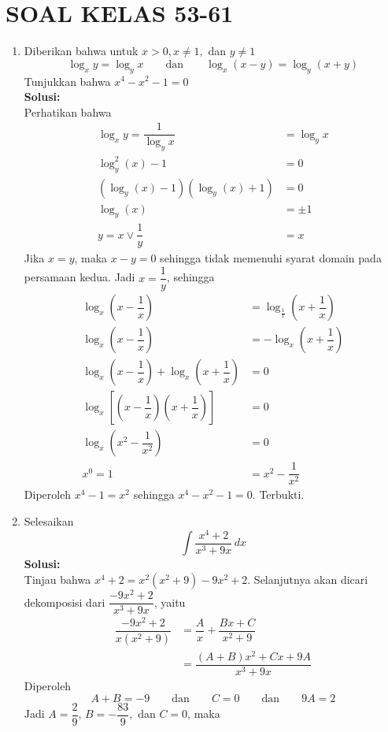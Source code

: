 \documentclass{article}
\begin{document}
\section*{SOAL KELAS 53-61}
\begin{enumerate}
	\item Diberikan bahwa untuk $x>0,x\neq 1,$ dan $y\neq 1$
	$$ \log_x y = \log_y x \qquad \text{dan}\qquad \log_x(x-y) = \log_y(x+y)$$
	Tunjukkan bahwa $x^4-x^2-1=0$\\
	\textbf{Solusi:}\\
	Perhatikan bahwa
	\begin{align*}
	\log_x y = \dfrac{1}{\log_y x} &= \log_y x\\
	\log_y^2 (x)-1 &= 0\\
	(\log_y (x)-1)(\log_y (x)+1) &= 0\\
	\log_y (x) &= \pm 1\\
	y = x \vee \dfrac{1}{y} &= x
	\end{align*}
	Jika $x=y$, maka $x-y=0$ sehingga tidak memenuhi syarat domain pada persamaan kedua. Jadi $x=\dfrac{1}{y}$, sehingga
	\begin{align*}
	\log_x \left(x-\dfrac{1}{x}\right) &= \log_{\frac{1}{x}} \left(x+\dfrac{1}{x}\right)\\
	\log_x \left(x-\dfrac{1}{x}\right) &= -\log_{x} \left(x+\dfrac{1}{x}\right)\\
	\log_x \left(x-\dfrac{1}{x}\right) +\log_{x} \left(x+\dfrac{1}{x}\right) &= 0\\
	\log_x \left[\left(x-\dfrac{1}{x}\right)\left(x+\dfrac{1}{x}\right)\right] &= 0\\
	\log_x \left(x^2-\dfrac{1}{x^2}\right) &= 0\\
	x^0 = 1 &= x^2-\dfrac{1}{x^2}
	\end{align*}
	Diperoleh $x^4-1 = x^2$ sehingga $x^4-x^2-1=0$. Terbukti.
	\item Selesaikan 
	$$ \int \dfrac{x^4+2}{x^3+9x}\, dx$$
	\textbf{Solusi:}\\
	Tinjau bahwa $	x^4+2 = x^2(x^2+9)-9x^2+2 $. Selanjutnya akan dicari dekomposisi dari $\dfrac{-9x^2+2}{x^3+9x}$, yaitu
	\begin{align*}
	\dfrac{-9x^2+2}{x(x^2+9)} &= \dfrac{A}{x} + \dfrac{Bx+C}{x^2+9}\\
	&= \dfrac{(A+B)x^2+Cx+9A}{x^3+9x}
	\end{align*}
	Diperoleh 
	$$ A+B = -9 \qquad\text{dan}\qquad C=0\qquad\text{dan}\qquad 9A=2$$
	Jadi $A=\dfrac{2}{9}$, $B=-\dfrac{83}{9},$ dan $C=0$, maka
	\begin{align*}

\end{align*}
\end{enumerate}
\end{document}
